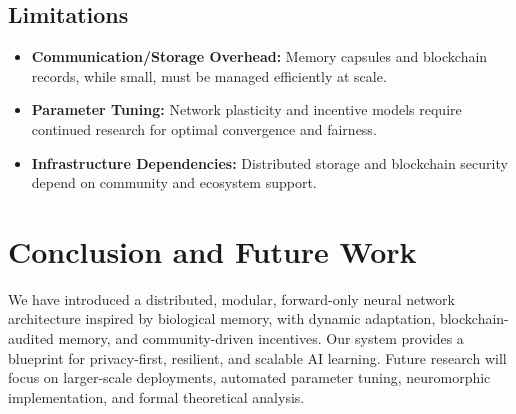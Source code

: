 \documentclass[11pt]{article}
\begin{document}
\subsection{Limitations}
\begin{itemize}
    \item \textbf{Communication/Storage Overhead:} Memory capsules and blockchain records, while small, must be managed efficiently at scale.
    \item \textbf{Parameter Tuning:} Network plasticity and incentive models require continued research for optimal convergence and fairness.
    \item \textbf{Infrastructure Dependencies:} Distributed storage and blockchain security depend on community and ecosystem support.
\end{itemize}

\section{Conclusion and Future Work}
We have introduced a distributed, modular, forward-only neural network architecture inspired by biological memory, with dynamic adaptation, blockchain-audited memory, and community-driven incentives. Our system provides a blueprint for privacy-first, resilient, and scalable AI learning. Future research will focus on larger-scale deployments, automated parameter tuning, neuromorphic implementation, and formal theoretical analysis.
\end{document}
